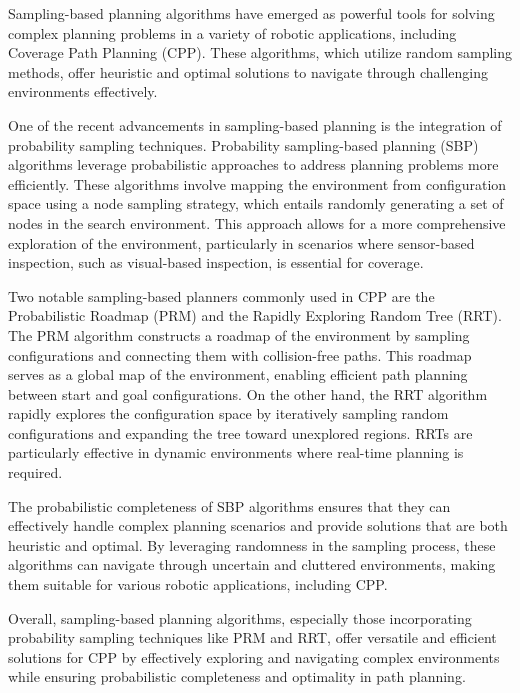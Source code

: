 Sampling-based planning algorithms have emerged as powerful tools for solving complex planning problems in a variety of robotic applications, including Coverage Path Planning (CPP). These algorithms, which utilize random sampling methods, offer heuristic and optimal solutions to navigate through challenging environments effectively.

\vspace*{6mm}

One of the recent advancements in sampling-based planning is the integration of probability sampling techniques. Probability sampling-based planning (SBP) algorithms leverage probabilistic approaches to address planning problems more efficiently. These algorithms involve mapping the environment from configuration space using a node sampling strategy, which entails randomly generating a set of nodes in the search environment. This approach allows for a more comprehensive exploration of the environment, particularly in scenarios where sensor-based inspection, such as visual-based inspection, is essential for coverage.

\vspace*{6mm}

Two notable sampling-based planners commonly used in CPP are the Probabilistic Roadmap (PRM) and the Rapidly Exploring Random Tree (RRT). The PRM algorithm constructs a roadmap of the environment by sampling configurations and connecting them with collision-free paths. This roadmap serves as a global map of the environment, enabling efficient path planning between start and goal configurations. On the other hand, the RRT algorithm rapidly explores the configuration space by iteratively sampling random configurations and expanding the tree toward unexplored regions. RRTs are particularly effective in dynamic environments where real-time planning is required.

\vspace*{6mm}

The probabilistic completeness of SBP algorithms ensures that they can effectively handle complex planning scenarios and provide solutions that are both heuristic and optimal. By leveraging randomness in the sampling process, these algorithms can navigate through uncertain and cluttered environments, making them suitable for various robotic applications, including CPP.

\vspace*{6mm}

Overall, sampling-based planning algorithms, especially those incorporating probability sampling techniques like PRM and RRT, offer versatile and efficient solutions for CPP by effectively exploring and navigating complex environments while ensuring probabilistic completeness and optimality in path planning.


